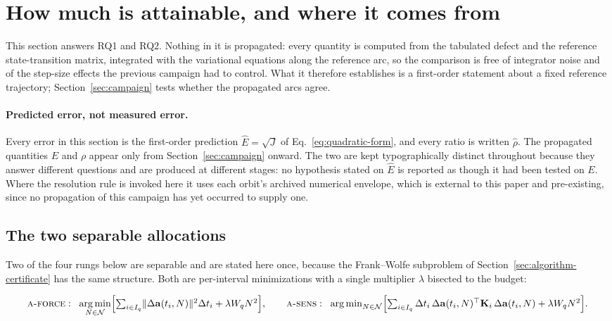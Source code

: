 \section{How much is attainable, and where it comes from}
\label{sec:benchmark}

This section answers RQ1 and RQ2. Nothing in it is propagated: every quantity
is computed from the tabulated defect and the reference state-transition
matrix, integrated with the variational equations along the reference arc,
so the comparison is free of integrator noise and of the step-size effects the
previous campaign had to control. What it therefore establishes is a
first-order statement about a fixed reference trajectory;
Section~\ref{sec:campaign} tests whether the propagated arcs agree.

\paragraph{Predicted error, not measured error.} Every error in this section is
the first-order prediction $\hat E=\sqrt{J}$ of Eq.~\eqref{eq:quadratic-form},
and every ratio is written $\hat\rho$. The propagated quantities $E$ and $\rho$
appear only from Section~\ref{sec:campaign} onward. The two are kept
typographically distinct throughout because they answer different questions and
are produced at different stages: no hypothesis stated on $\hat E$ is reported
as though it had been tested on $E$. Where the resolution rule is invoked here
it uses each orbit's archived numerical envelope, which is external to this
paper and pre-existing, since no propagation of this campaign has yet occurred
to supply one.

\subsection{The two separable allocations}
\label{sec:benchmark-sens}

Two of the four rungs below are separable and are stated here once, because
the Frank--Wolfe subproblem of Section~\ref{sec:algorithm-certificate} has the
same structure. Both are per-interval minimizations with a single multiplier
$\lambda$ bisected to the budget:

\begin{equation}
  \textsc{a-force}:\;\;
  \operatorname*{arg\,min}_{N\in\mathcal{N}}\Bigl[\textstyle\sum_{i\in I_q}
    \lVert\Delta\mathbf a(t_i,N)\rVert^2\Delta t_i
    +\lambda W_q N^2\Bigr],
  \qquad
  \textsc{a-sens}:\;\;
  \operatorname*{arg\,min}_{N\in\mathcal{N}}\Bigl[\textstyle\sum_{i\in I_q}
    \Delta t_i\,\Delta\mathbf a(t_i,N)^{\top}\mathbf K_i\,
    \Delta\mathbf a(t_i,N)
    +\lambda W_q N^2\Bigr].
  \label{eq:separable}
\end{equation}

